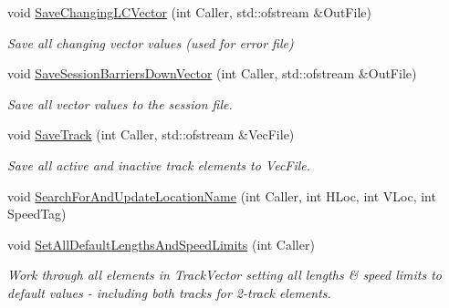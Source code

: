 \begin{DoxyCompactItemize}
\mbox{\label{class_t_track_a6e1031277500eadfd3a0751e4ca4057b}} 
void \mbox{\hyperlink{class_t_track_a6e1031277500eadfd3a0751e4ca4057b}{Save\+Changing\+L\+C\+Vector}} (int Caller, std\+::ofstream \&Out\+File)
\begin{DoxyCompactList}\small\item\em Save all changing vector values (used for error file) \end{DoxyCompactList}\item 
\mbox{\label{class_t_track_aabbf9502a68e95e1f9d0b8571d9fb57c}} 
void \mbox{\hyperlink{class_t_track_aabbf9502a68e95e1f9d0b8571d9fb57c}{Save\+Session\+Barriers\+Down\+Vector}} (int Caller, std\+::ofstream \&Out\+File)
\begin{DoxyCompactList}\small\item\em Save all vector values to the session file. \end{DoxyCompactList}\item 
\mbox{\label{class_t_track_a07acf18405f5192f30f5f412c9182d94}} 
void \mbox{\hyperlink{class_t_track_a07acf18405f5192f30f5f412c9182d94}{Save\+Track}} (int Caller, std\+::ofstream \&Vec\+File)
\begin{DoxyCompactList}\small\item\em Save all active and inactive track elements to Vec\+File. \end{DoxyCompactList}\item 
void \mbox{\hyperlink{class_t_track_a68519138e3b39b6ab9433cc9f7862c64}{Search\+For\+And\+Update\+Location\+Name}} (int Caller, int H\+Loc, int V\+Loc, int Speed\+Tag)
\item 
\mbox{\label{class_t_track_ad8d0a63ce71bceab09667aa3623b862d}} 
void \mbox{\hyperlink{class_t_track_ad8d0a63ce71bceab09667aa3623b862d}{Set\+All\+Default\+Lengths\+And\+Speed\+Limits}} (int Caller)
\begin{DoxyCompactList}\small\item\em Work through all elements in Track\+Vector setting all lengths \& speed limits to default values -\/ including both tracks for 2-\/track elements. \end{DoxyCompactList}\item 
\mbox{\label{class_t_track_a31296f2176bd672769e1852ca90ddd51}} 

\end{DoxyCompactItemize}
